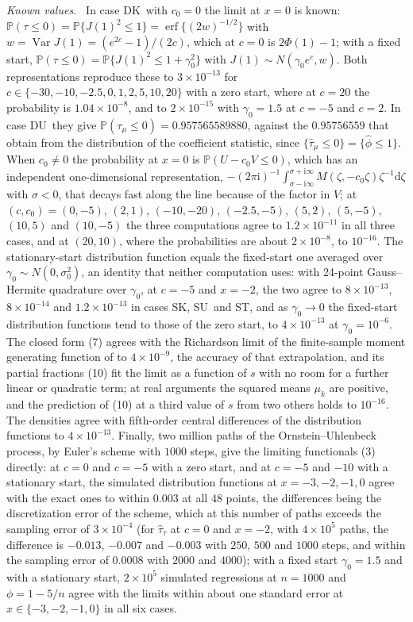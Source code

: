 \documentclass[ecta,nameyear,final,supplement]{econsocart}
\newcommand{\PP}{{\mathbb P}}
\newcommand{\dr}[1]{{\mathrm d}#1}
\newcommand{\iu}{{\mathrm i}}
\newcommand{\Var}{\operatorname{Var}}
\newcommand{\erf}{\operatorname{erf}}
\newcommand{\phih}{\hat\phi}
\newcommand{\Fk}{\textsf{\upshape DK}}
\newcommand{\Fu}{\textsf{\upshape DU}}
\newcommand{\Sk}{\textsf{\upshape SK}}
\newcommand{\Su}{\textsf{\upshape SU}}
\newcommand{\St}{\textsf{\upshape ST}}
\theoremstyle{plain}
\theoremstyle{definition}
\newcommand{\runin}[1]{\par\medskip\noindent\textit{#1.}\ \ignorespaces}
\begin{document}
\runin{Known values}  In case \Fk\ with $c_0=0$ the limit at $x=0$ is known: $\PP(\tau\le0)=\PP\{J(1)^2\le1\}=\erf\{(2w)^{-1/2}\}$ with $w=\Var J(1)=(e^{2c}-1)/(2c)$, which at $c=0$ is $2\Phi(1)-1$; with a fixed start, $\PP(\tau\le0)=\PP\{J(1)^2\le1+\gamma_0^2\}$ with $J(1)\sim N(\gamma_0e^c,w)$.  Both representations reproduce these to $3\times10^{-13}$ for $c\in\{-30,-10,-2.5,0,1,2,5,10,20\}$ with a zero start, where at $c=20$ the probability is $1.04\times10^{-8}$, and to $2\times10^{-15}$ with $\gamma_0=1.5$ at $c=-5$ and $c=2$.  In case \Fu\ they give $\PP(\tau_\mu\le0)=0.957565589880$, against the $0.95756559$ that \cite{BaoKan2026} obtain from the distribution of the coefficient statistic, since $\{\hat\tau_\mu\le0\}=\{\phih\le1\}$.  When $c_0\ne0$ the probability at $x=0$ is $\PP(U-c_0V\le0)$, which has an independent one-dimensional representation, $-(2\pi\iu)^{-1}\int_{\sigma-\iu\infty}^{\sigma+\iu\infty}M(\zeta,-c_0\zeta)\zeta^{-1}\dr{\zeta}$ with $\sigma<0$, that decays fast along the line because of the factor in $V$; at $(c,c_0)=(0,-5)$, $(2,1)$, $(-10,-20)$, $(-2.5,-5)$, $(5,2)$, $(5,-5)$, $(10,5)$ and $(10,-5)$ the three computations agree to $1.2\times10^{-11}$ in all three cases, and at $(20,10)$, where the probabilities are about $2\times10^{-8}$, to $10^{-16}$.  The stationary-start distribution function equals the fixed-start one averaged over $\gamma_0\sim N(0,\sigma_0^2)$, an identity that neither computation uses: with 24-point Gauss--Hermite quadrature over $\gamma_0$, at $c=-5$ and $x=-2$, the two agree to $8\times10^{-13}$, $8\times10^{-14}$ and $1.2\times10^{-13}$ in cases \Sk, \Su\ and \St, and as $\gamma_0\to0$ the fixed-start distribution functions tend to those of the zero start, to $4\times10^{-13}$ at $\gamma_0=10^{-6}$.  The closed form (7) agrees with the Richardson limit of the finite-sample moment generating function of \cite{BaoBrodaKan2026} to $4\times10^{-9}$, the accuracy of that extrapolation, and its partial fractions (10) fit the limit as a function of $s$ with no room for a further linear or quadratic term; at real arguments the squared means $\mu_k$ are positive, and the prediction of (10) at a third value of $s$ from two others holds to $10^{-16}$.  The densities agree with fifth-order central differences of the distribution functions to $4\times10^{-13}$.  Finally, two million paths of the Ornstein--Uhlenbeck process, by Euler's scheme with $1000$ steps, give the limiting functionals (3) directly: at $c=0$ and $c=-5$ with a zero start, and at $c=-5$ and $-10$ with a stationary start, the simulated distribution functions at $x=-3,-2,-1,0$ agree with the exact ones to within $0.003$ at all $48$ points, the differences being the discretization error of the scheme, which at this number of paths exceeds the sampling error of $3\times10^{-4}$ (for $\hat\tau_\tau$ at $c=0$ and $x=-2$, with $4\times10^5$ paths, the difference is $-0.013$, $-0.007$ and $-0.003$ with $250$, $500$ and $1000$ steps, and within the sampling error of $0.0008$ with $2000$ and $4000$); with a fixed start $\gamma_0=1.5$ and with a stationary start, $2\times10^5$ simulated regressions at $n=1000$ and $\phi=1-5/n$ agree with the limits within about one standard error at $x\in\{-3,-2,-1,0\}$ in all six cases.




\end{document}
